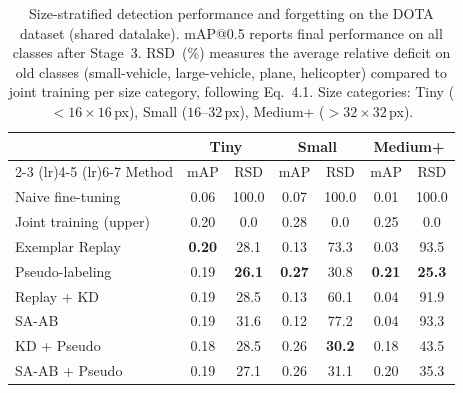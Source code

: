 \begin{table}[t]
\centering
\caption{Size-stratified detection performance and forgetting on the DOTA dataset (shared datalake). mAP@0.5 reports final performance on all classes after Stage~3. RSD~(\%) measures the average relative deficit on old classes (small-vehicle, large-vehicle, plane, helicopter) compared to joint training per size category, following Eq.~4.1. Size categories: Tiny ($< 16 \times 16$\,px), Small ($16$--$32$\,px), Medium+ ($> 32 \times 32$\,px).}
\label{tab:dota-size}
\begin{tabular}{l cc cc cc}
\toprule
           & \multicolumn{2}{c}{Tiny} & \multicolumn{2}{c}{Small} & \multicolumn{2}{c}{Medium+} \\
\cmidrule(lr){2-3} \cmidrule(lr){4-5} \cmidrule(lr){6-7}
Method     & mAP & RSD & mAP & RSD & mAP & RSD \\
\midrule
Naive fine-tuning         & 0.06 & 100.0 & 0.07 & 100.0 & 0.01 & 100.0 \\
Joint training (upper)    & 0.20 & 0.0 & 0.28 & 0.0 & 0.25 & 0.0 \\
\midrule
Exemplar Replay           & \textbf{0.20} & 28.1 & 0.13 & 73.3 & 0.03 & 93.5 \\
Pseudo-labeling           & 0.19 & \textbf{26.1} & \textbf{0.27} & 30.8 & \textbf{0.21} & \textbf{25.3} \\
Replay + KD               & 0.19 & 28.5 & 0.13 & 60.1 & 0.04 & 91.9 \\
SA-AB                     & 0.19 & 31.6 & 0.12 & 77.2 & 0.04 & 93.3 \\
\midrule
KD + Pseudo               & 0.18 & 28.5 & 0.26 & \textbf{30.2} & 0.18 & 43.5 \\
SA-AB + Pseudo            & 0.19 & 27.1 & 0.26 & 31.1 & 0.20 & 35.3 \\
\bottomrule
\end{tabular}
\end{table}
